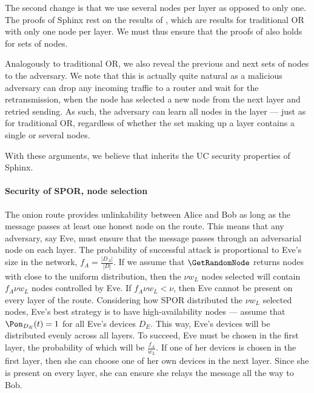 The second change is that we use several nodes per layer as opposed to only 
one.
The proofs of Sphinx rest on the results of \textcite{CLOnionRouting}, which 
are results for traditional \ac{OR} with only one node per layer.
We must thus ensure that the proofs of \citeauthor{CLOnionRouting} also holds 
for sets of nodes.

Analogously to traditional \ac{OR}, we also reveal the previous and next sets 
of nodes to the adversary.
We note that this is actually quite natural as a malicious adversary can drop 
any incoming traffic to a router and wait for the retransmission, \ie when the 
node has selected a new node from the next layer and retried sending.
As such, the adversary can learn all nodes in the layer --- just as for 
traditional \ac{OR}, regardless of whether the set making up a layer contains a
single or several nodes.

With these arguments, we believe that \Sphinxes inherits the \ac{UC} security 
properties of Sphinx. %

\paragraph*{Security of \acs*{SPOR}, node selection}

The onion route provides unlinkability between Alice and Bob as long as the 
message passes at least one honest node on the route.
This means that any adversary, say Eve,  must ensure that the message passes 
through an adversarial node on each layer.
The probability of successful attack is proportional to Eve's size in the 
network, \ie \(f_A = \frac{|D_A|}{|D|}\).
If we assume that \(\GetRandomNode\) returns nodes with close to the uniform 
distribution, then the \(\nu w_L\) nodes selected will contain \(f_A \nu w_L\) 
nodes controlled by Eve.
If \(f_A \nu w_L < \nu\), then Eve cannot be present on every layer of the 
route.
Considering how \ac{SPOR} distributed the \(\nu w_L\) selected nodes, Eve's 
best strategy is to have high-availability nodes --- assume that 
\(\Pon_{D_E}(t) = 1\) for all Eve's devices \(D_E\).
This way, Eve's devices will be distributed evenly across all layers.
To succeed, Eve must be chosen in the first layer, the probability of which 
will be \(\frac{f_A}{w_L}\).
If one of her devices is chosen in the first layer, then she can choose one of 
her own devices in the next layer.
Since she is present on every layer, she can ensure she relays the message all 
the way to Bob. 

